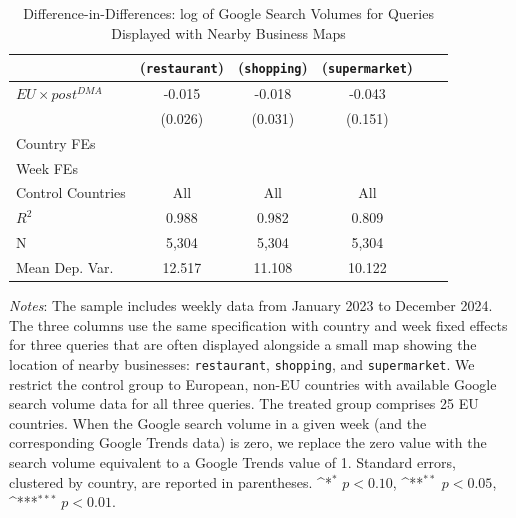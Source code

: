 \documentclass[11pt]{article}
\begin{document}
	\clearpage
	
	\begin{table}[!ht]
		\centering
		\def\sym#1{\ifmmode^{#1}\else\(^{#1}\)\fi}
		\caption{\label{tab:did_geo_query} Difference-in-Differences: log of Google Search Volumes for Queries Displayed with Nearby Business Maps}
		\begin{threeparttable}
			\begin{tabular}{lccccc}
				\hline \noalign{\smallskip} 
				
				&(\texttt{restaurant})   &(\texttt{shopping})   &(\texttt{supermarket})   \\
				\midrule
				$ EU \times post^{DMA} $ &      -0.015   &      -0.018   &      -0.043   \\
				&     (0.026)   &     (0.031)   &     (0.151)   \\
				
				Country FEs         &  \checkmark   &  \checkmark   &  \checkmark   \\
				Week FEs            &  \checkmark   &  \checkmark   &  \checkmark   \\
				Control Countries   &         All   &         All   &         All   \\
				$ R ^2 $            &       0.988   &       0.982   &       0.809   \\
				N                   &       5,304   &       5,304   &       5,304   \\
				Mean Dep. Var.      &      12.517   &      11.108   &      10.122   \\
				\midrule
			\end{tabular}
			
			\begin{tablenotes}
				\item \footnotesize \emph{Notes}: The sample includes weekly data from January 2023 to December 2024. The three columns use the same specification with country and week fixed effects for three queries that are often displayed alongside a small map showing the location of nearby businesses: \texttt{restaurant}, \texttt{shopping}, and \texttt{supermarket}. We restrict the control group to European, non-EU countries with available Google search volume data for all three queries. The treated group comprises 25 EU countries. When the Google search volume in a given week (and the corresponding Google Trends data) is zero, we replace the zero value with the search volume equivalent to a Google Trends value of 1. Standard errors, clustered by country, are reported in parentheses. \sym{*} \(p<0.10\), \sym{**} \(p<0.05\), \sym{***}  \(p<0.01\).   
			\end{tablenotes}
		\end{threeparttable}
	\end{table}
	
\end{document}
